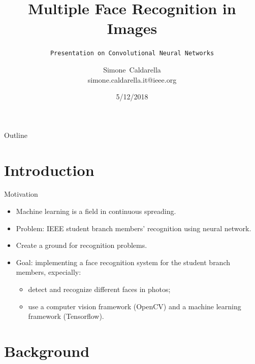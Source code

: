 \documentclass{beamer}
\title[Face recognition]{\textbf{Multiple Face Recognition in Images}}
\subtitle{\texttt{Presentation on Convolutional Neural Networks}}
\author[Simone Caldarella]
{Simone~Caldarella\\
simone.caldarella.it@ieee.org}
\institute[University of Brescia] 
{
  	IEEE Student Branch Brescia\\
  	University of Brescia
}
\date[IEEE Student Branch 2018] 
{
	5/12/2018
}
\begin{document}
\begin{frame}
 	\titlepage
\end{frame}

\begin{frame}{Outline}
	\begin{multicols}{2}
  		\tableofcontents
	\end{multicols}
\end{frame}


\section{Introduction}


\begin{frame}{Motivation}
	\begin{itemize}
		\setlength\itemsep{1em}
		[triangle]
		\item
			Machine learning is a field in continuous spreading.
		\item
			Problem: IEEE student branch members' recognition using neural network.
		\item 
    			Create a ground for recognition problems.
		\item
			Goal: implementing a face recognition system for the student branch members, expecially:
		\begin{itemize}
				[circle]
    				\item
      					detect and recognize different faces in photos;
    				\item    
      					use a computer vision framework (OpenCV) and a machine learning framework (Tensorflow).
 
			\end{itemize}
	\end{itemize}
\end{frame}



\section{Background}
\end{document}
